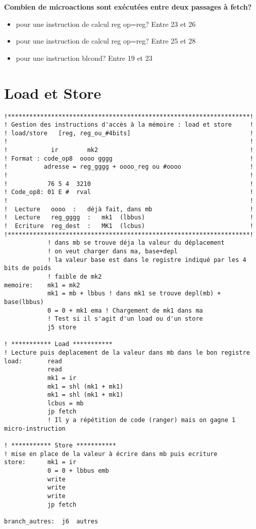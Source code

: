 \documentclass{myArticle}
\begin{document}
\textbf{Combien de microactions sont exécutées entre deux passages à fetch?}
\begin{itemize}
\item pour une instruction de calcul reg op=reg? Entre 23 et 26
\item pour une instruction de calcul reg op=reg? Entre 25 et 28
\item pour une instruction blcond? Entre 19 et 23
\end{itemize}

\newpage
\section{Load et Store}
\begin{lstlisting}
!*******************************************************************!
! Gestion des instructions d'accès à la mémoire : load et store     !
! load/store   [reg, reg_ou_#4bits]                                 !
!                                                                   !
!            ir        mk2                                          !
! Format : code_op8  oooo gggg                                      !
!          adresse = reg_gggg + oooo_reg ou #oooo                   !
!                                                                   !
!           76 5 4  3210                                            !
! Code_op8: 01 E #  rval                                            !
!                                                                   !
!  Lecture   oooo  :   déjà fait, dans mb                           !
!  Lecture   reg_gggg  :   mk1  (lbbus)                             !
!  Ecriture  reg_dest  :   MK1  (lcbus)                             !
!*******************************************************************!
            ! dans mb se trouve déja la valeur du déplacement
            ! on veut charger dans ma, base+depl
            ! la valeur base est dans le registre indiqué par les 4 bits de poids
            ! faible de mk2
memoire:    mk1 = mk2
            mk1 = mb + lbbus ! dans mk1 se trouve depl(mb) + base(lbbus)
            0 = 0 + mk1 ema ! Chargement de mk1 dans ma
            ! Test si il s'agit d'un load ou d'un store
            j5 store

! *********** Load ***********
! Lecture puis deplacement de la valeur dans mb dans le bon registre
load:       read
            read
            mk1 = ir
            mk1 = shl (mk1 + mk1)
            mk1 = shl (mk1 + mk1)
            lcbus = mb
            jp fetch
            ! Il y a répétition de code (ranger) mais on gagne 1 micro-instruction

! *********** Store ***********
! mise en place de la valeur à écrire dans mb puis ecriture
store:      mk1 = ir
            0 = 0 + lbbus emb
            write
            write
            write
            jp fetch

branch_autres:  j6  autres
\end{lstlisting}
\end{document}
